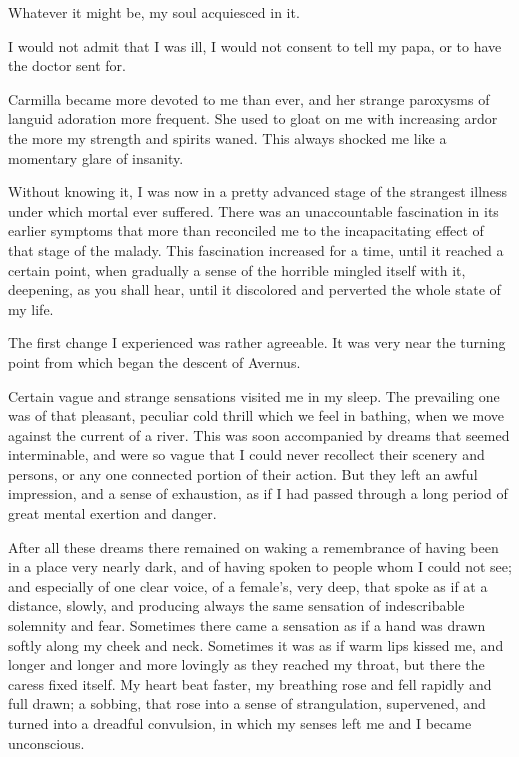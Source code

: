 \documentclass[11pt,twoside,makeidx,hidelinks,]{memoir}
\begin{document}
Whatever it might be, my soul acquiesced in it.

I would not admit that I was ill, I would not consent to tell my papa,
or to have the doctor sent for.

Carmilla became more devoted to me than ever, and her strange paroxysms
of languid adoration more frequent. She used to gloat on me with
increasing ardor the more my strength and spirits waned. This always
shocked me like a momentary glare of insanity.

Without knowing it, I was now in a pretty advanced stage of the
strangest illness under which mortal ever suffered. There was an
unaccountable fascination in its earlier symptoms that more than
reconciled me to the incapacitating effect of that stage of the malady.
This fascination increased for a time, until it reached a certain point,
when gradually a sense of the horrible mingled itself with it,
deepening, as you shall hear, until it discolored and perverted the
whole state of my life.

The first change I experienced was rather agreeable. It was very near
the turning point from which began the descent of Avernus.

Certain vague and strange sensations visited me in my sleep. The
prevailing one was of that pleasant, peculiar cold thrill which we feel
in bathing, when we move against the current of a river. This was soon
accompanied by dreams that seemed interminable, and were so vague that
I could never recollect their scenery and persons, or any one connected
portion of their action. But they left an awful impression, and a sense
of exhaustion, as if I had passed through a long period of great mental
exertion and danger.

After all these dreams there remained on waking a remembrance of having
been in a place very nearly dark, and of having spoken to people whom I
could not see; and especially of one clear voice, of a female's, very
deep, that spoke as if at a distance, slowly, and producing always the
same sensation of indescribable solemnity and fear. Sometimes there came
a sensation as if a hand was drawn softly along my cheek and neck.
Sometimes it was as if warm lips kissed me, and longer and longer and
more lovingly as they reached my throat, but there the caress fixed
itself. My heart beat faster, my breathing rose and fell rapidly and
full drawn; a sobbing, that rose into a sense of strangulation,
supervened, and turned into a dreadful convulsion, in which my senses
left me and I became unconscious.
\end{document}
